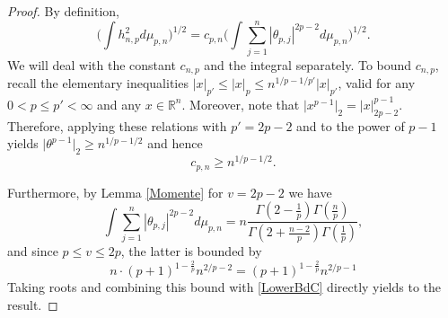 \documentclass[a4paper,12pt]{amsart}
\numberwithin{equation}{section}
\theoremstyle{remark}
\def\R{{\mathbb R}}
\begin{document}
\begin{proof}
    By definition,
    \[
    \Big( \int h_{n,p}^2 d\mu_{p,n} \Big)^{1/2} = c_{p,n} \Big(\int \sum_{j=1}^n |\theta_{p,j}|^{2p-2} d\mu_{p,n}\Big)^{1/2}.
    \]
    We will deal with the constant $c_{n,p}$ and the integral separately. To bound $c_{n,p}$, recall the elementary inequalities $\lvert x \rvert_{p'} \le \lvert x \rvert_p \le n^{1/p-1/p'} \lvert x \rvert_{p'}$, valid for any $0 < p \le p' < \infty$ and any $x \in \R^n$. Moreover, note that $\lvert x^{p-1} \rvert_2 = \lvert x \rvert_{2p-2}^{p-1}$. Therefore, applying these relations with $p'=2p-2$ and to the power of $p-1$ yields $\lvert \theta^{p-1} \rvert_2 \ge n^{1/p-1/2}$ and hence
    \begin{equation}\label{LowerBdC}
    c_{p,n} \ge n^{1/p-1/2}.
    \end{equation}

    Furthermore, by Lemma \ref{Momente} for $v=2p-2$ we have
    \[
    \int \sum_{j=1}^n |\theta_{p,j}|^{2p-2} d\mu_{p,n} = n \frac{ \Gamma(2-\frac 1 p)\Gamma(\frac{n} {p})} {\Gamma(2+\frac{n-2} {p}) \Gamma(\frac 1 p)},
    \]
    and since $p \le v \le 2p$, the latter is bounded by
    \[
    n \cdot (p+1)^{1 - \frac{2}{p}} n^{2/p-2} = (p+1)^{1 - \frac{2}{p}} n^{2/p-1}
    \]
Taking roots and combining this bound with \eqref{LowerBdC} directly yields to the result.
\end{proof}
\end{document}
